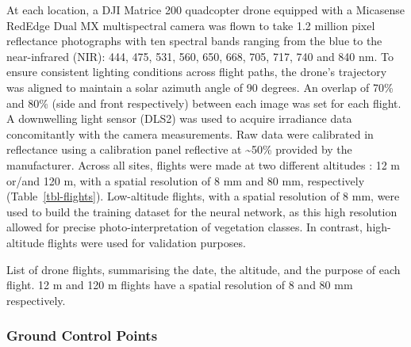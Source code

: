 \documentclass[
  number]{elsarticle}
\begin{document}
At each location, a DJI Matrice 200 quadcopter drone equipped with a
Micasense RedEdge Dual MX multispectral camera was flown to take 1.2
million pixel reflectance photographs with ten spectral bands ranging
from the blue to the near-infrared (NIR): 444, 475, 531, 560, 650, 668,
705, 717, 740 and 840 nm. To ensure consistent lighting conditions
across flight paths, the drone's trajectory was aligned to maintain a
solar azimuth angle of 90 degrees. An overlap of 70\% and 80\% (side and
front respectively) between each image was set for each flight. A
downwelling light sensor (DLS2) was used to acquire irradiance data
concomitantly with the camera measurements. Raw data were calibrated in
reflectance using a calibration panel reflective at \textasciitilde50\%
provided by the manufacturer. Across all sites, flights were made at two
different altitudes : 12 m or/and 120 m, with a spatial resolution of 8
mm and 80 mm, respectively (Table~\ref{tbl-flights}). Low-altitude
flights, with a spatial resolution of 8 mm, were used to build the
training dataset for the neural network, as this high resolution allowed
for precise photo-interpretation of vegetation classes. In contrast,
high-altitude flights were used for validation purposes.

\begin{table}

\caption{\label{tbl-flights}List of drone flights, summarising the date,
the altitude, and the purpose of each flight. 12 m and 120 m flights
have a spatial resolution of 8 and 80 mm respectively.}


\end{table}%

\subsubsection{Ground Control Points}\label{ground-control-points}
\end{document}
